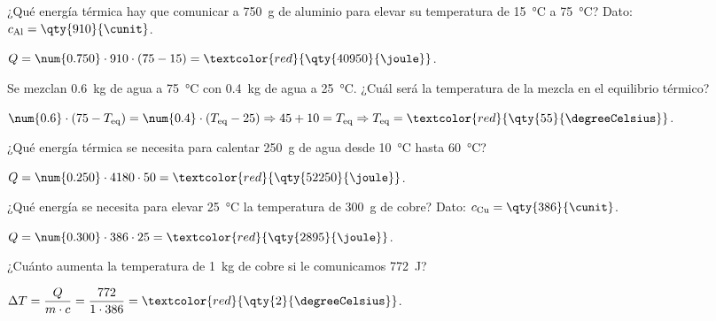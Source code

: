 \begin{exercise}
    ¿Qué energía térmica hay que comunicar a \qty{750}{\gram} de aluminio para elevar su temperatura de \qty{15}{\degreeCelsius} a \qty{75}{\degreeCelsius}? Dato: \(c_{\text{Al}} = \qty{910}{\cunit}\).
    \begin{solu}
        \(Q = \num{0.750} \cdot 910 \cdot (75 - 15) = \textcolor{red}{\qty{40950}{\joule}}\).
    \end{solu}
\end{exercise}

\begin{exercise}
    Se mezclan \qty{0.6}{\kg} de agua a \qty{75}{\degreeCelsius} con \qty{0.4}{\kg} de agua a \qty{25}{\degreeCelsius}. ¿Cuál será la temperatura de la mezcla en el equilibrio térmico?
    \begin{solu}
        \(\num{0.6} \cdot (75 - T_{\text{eq}}) = \num{0.4} \cdot (T_{\text{eq}} - 25) \Rightarrow 45 + 10 = T_{\text{eq}} \Rightarrow T_{\text{eq}} = \textcolor{red}{\qty{55}{\degreeCelsius}}\).
    \end{solu}
\end{exercise}

\begin{exercise}
    ¿Qué energía térmica se necesita para calentar \qty{250}{\gram} de agua desde \qty{10}{\degreeCelsius} hasta \qty{60}{\degreeCelsius}?
    \begin{solu}
        \(Q = \num{0.250} \cdot 4180 \cdot 50 = \textcolor{red}{\qty{52250}{\joule}}\).
    \end{solu}
\end{exercise}

\begin{exercise}
    ¿Qué energía se necesita para elevar \qty{25}{\degreeCelsius} la temperatura de \qty{300}{\gram} de cobre? Dato: \(c_{\text{Cu}} = \qty{386}{\cunit}\).
    \begin{solu}
        \(Q = \num{0.300} \cdot 386 \cdot 25 = \textcolor{red}{\qty{2895}{\joule}}\).
    \end{solu}
\end{exercise}

\begin{exercise}
    ¿Cuánto aumenta la temperatura de \qty{1}{\kg} de cobre si le comunicamos \qty{772}{\joule}?
    \begin{solu}
        \(\Delta T = \dfrac{Q}{m \cdot c} = \dfrac{772}{1 \cdot 386} = \textcolor{red}{\qty{2}{\degreeCelsius}}\).
    \end{solu}
\end{exercise}


